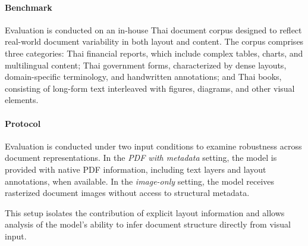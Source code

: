 \documentclass[]{typhoon} %
\begin{document}
\paragraph{Benchmark}
Evaluation is conducted on an in-house Thai document corpus designed to reflect real-world document variability in both layout and content. The corpus comprises three categories: Thai financial reports, which include complex tables, charts, and multilingual content; Thai government forms, characterized by dense layouts, domain-specific terminology, and handwritten annotations; and Thai books, consisting of long-form text interleaved with figures, diagrams, and other visual elements.

\paragraph{Protocol}

Evaluation is conducted under two input conditions to examine robustness across document representations. In the \emph{PDF with metadata} setting, the model is provided with native PDF information, including text layers and layout annotations, when available. In the \emph{image-only} setting, the model receives rasterized document images without access to structural metadata.

This setup isolates the contribution of explicit layout information and allows analysis of the model's ability to infer document structure directly from visual input.





\end{document}
